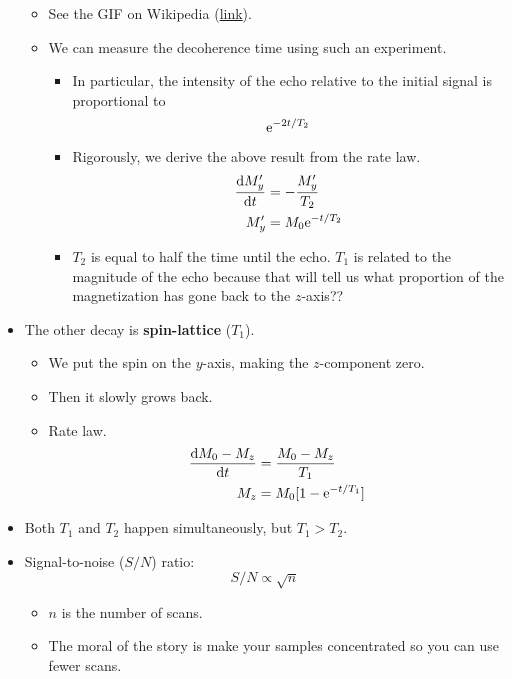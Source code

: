 \documentclass[../notes.tex]{subfiles}
\begin{document}
\begin{itemize}
\begin{itemize}
        \item See the GIF on Wikipedia (\href{https://en.wikipedia.org/wiki/Spin_echo}{link}).
        \item We can measure the decoherence time using such an experiment.
        \begin{itemize}
            \item In particular, the intensity of the echo relative to the initial signal is proportional to
            \begin{equation*}
                \e[-2t/T_2]
            \end{equation*}
            \item Rigorously, we derive the above result from the rate law.
            \begin{align*}
                \dv{M_y'}{t} &= -\frac{M_y'}{T_2}\\
                M_y' &= M_0\e[-t/T_2]
            \end{align*}
            \item $T_2$ is equal to half the time until the echo. $T_1$ is related to the magnitude of the echo because that will tell us what proportion of the magnetization has gone back to the $z$-axis??
        \end{itemize}
    \end{itemize}
    \item The other decay is \textbf{spin-lattice} ($T_1$).
    \begin{itemize}
        \item We put the spin on the $y$-axis, making the $z$-component zero.
        \item Then it slowly grows back.
        \item Rate law.
        \begin{align*}
            \dv{M_0-M_z}{t} &= \frac{M_0-M_z}{T_1}\\
            M_z &= M_0[1-\e[-t/T_1]]
        \end{align*}
    \end{itemize}
    \item Both $T_1$ and $T_2$ happen simultaneously, but $T_1>T_2$.
    \item Signal-to-noise ($S/N$) ratio:
    \begin{equation*}
        S/N \propto \sqrt{n}
    \end{equation*}
    \begin{itemize}
        \item $n$ is the number of scans.
        \item The moral of the story is make your samples concentrated so you can use fewer scans.

\end{itemize}
\end{itemize}
\end{document}
